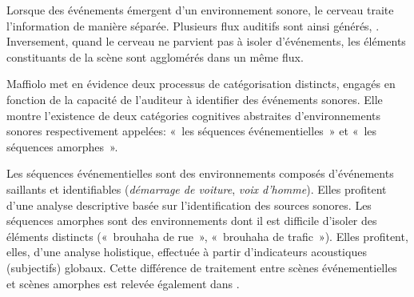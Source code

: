 \documentclass[twoside,twocolumn]{article}
\begin{document}


Lorsque des événements émergent d'un environnement sonore, le cerveau traite l'information  de manière séparée. Plusieurs flux auditifs sont ainsi générés,  \cite{carlyon2004brain}. Inversement, quand le cerveau ne parvient pas à isoler d'événements, les éléments constituants de la scène sont agglomérés dans un même flux. 

Maffiolo \cite{maffiolo_caracterisation_1999} met en évidence deux processus de catégorisation distincts, engagés en fonction de la capacité de l'auditeur à identifier des événements sonores. Elle montre l'existence de deux catégories cognitives abstraites d'environnements sonores respectivement appelées: «~les séquences événementielles~» et «~les séquences amorphes~». 

Les séquences événementielles sont des environnements composés d'événements saillants et identifiables (\emph{démarrage de voiture}, \emph{voix d'homme}). Elles profitent d'une analyse descriptive basée sur l'identification des sources sonores. Les séquences amorphes sont des environnements dont il est difficile d'isoler des éléments distincts («~brouhaha de rue~», «~brouhaha de trafic~»). Elles profitent, elles, d'une analyse holistique, effectuée à partir d'indicateurs acoustiques (subjectifs) globaux. Cette différence de traitement entre scènes événementielles et scènes amorphes est relevée également dans \cite{guastavino2006ideal,dubois2006cognitive}.
\end{document}
